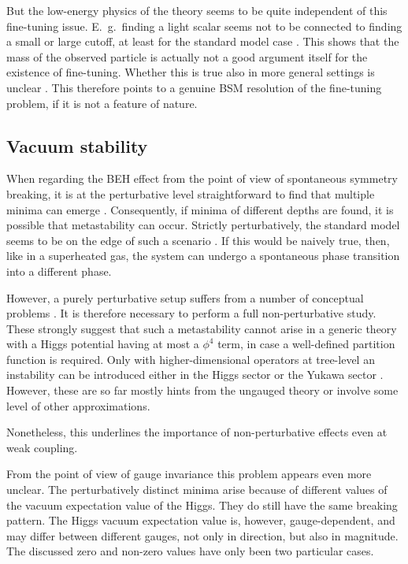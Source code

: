 \documentclass[final,12pt,3p,longtitle]{elsarticle}
\newcommand*{\1}{1\!\!\!\bot}
\begin{document}
But the low-energy physics of the theory seems to be quite independent of this fine-tuning issue. E.\ g.\ finding a light scalar seems not to be connected to finding a small or large cutoff, at least for the standard model case \cite{Maas:2014pba}. This shows that the mass of the observed particle is actually not a good argument itself for the existence of fine-tuning. Whether this is true also in more general settings is unclear \cite{Maas:unpublishedtoerek}. This therefore points to a genuine BSM resolution of the fine-tuning problem, if it is not a feature of nature.

\subsection{Vacuum stability}\label{ss:vs}

When regarding the BEH effect from the point of view of spontaneous symmetry breaking, it is at the perturbative level straightforward to find that multiple minima can emerge \cite{Sher:1988mj,EliasMiro:2011aa,Alekhin:2012py}. Consequently, if minima of different depths are found, it is possible that metastability can occur. Strictly perturbatively, the standard model seems to be on the edge of such a scenario \cite{Alekhin:2012py,Buttazzo:2013uya,Gabrielli:2013hma,Bednyakov:2015sca,Iacobellis:2016eof}. If this would be naively true, then, like in a superheated gas, the system can undergo a spontaneous phase transition into a different phase.

However, a purely perturbative setup suffers from a number of conceptual problems \cite{Holland:2003jr,Branchina:2005tu,Branchina:2008pc,Bulava:2012rb,Branchina:2014rva,Eichhorn:2015kea,Borchardt:2016xju}. It is therefore necessary to perform a full non-perturbative study. These strongly suggest that such a metastability cannot arise \cite{Bulava:2012rb,Eichhorn:2015kea,Borchardt:2016xju} in a generic theory with a Higgs potential having at most a $\phi^4$ term, in case a well-defined partition function is required. Only with higher-dimensional operators at tree-level an instability can be introduced either in the Higgs sector \cite{Chu:2015nha,Eichhorn:2015kea,Sondenheimer:2017jin} or the Yukawa sector \cite{Gies:2017zwf}. However, these are so far mostly hints from the ungauged theory or involve some level of other approximations.

Nonetheless, this underlines the importance of non-perturbative effects even at weak coupling.

From the point of view of gauge invariance this problem appears even more unclear. The perturbatively distinct minima arise because of different values of the vacuum expectation value of the Higgs. They do still have the same breaking pattern. The Higgs vacuum expectation value is, however, gauge-dependent, and may differ between different gauges, not only in direction, but also in magnitude. The discussed zero and non-zero values have only been two particular cases.
\end{document}
